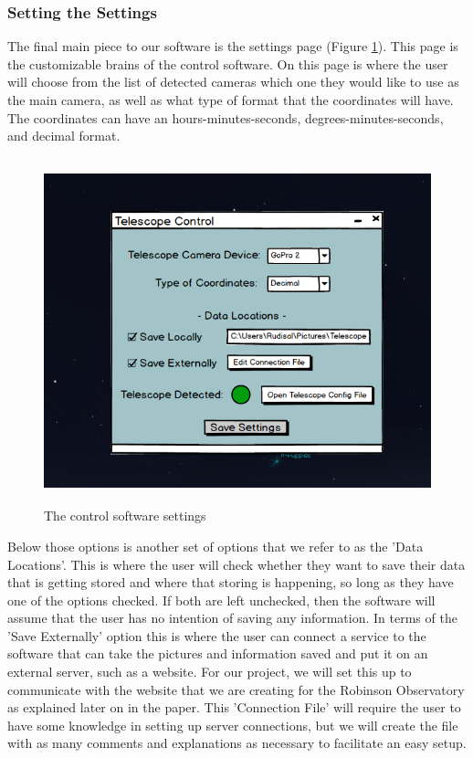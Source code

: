 \documentclass[12pt]{article}
\begin{document}
\newpage

\subsubsection{Setting the Settings}

The final main piece to our software is the settings page (Figure \ref{fig:Settings}). This page is the customizable brains of the control software. On this page is where the user will choose from the list of detected cameras which one they would like to use as the main camera, as well as what type of format that the coordinates will have. The coordinates can have an hours-minutes-seconds, degrees-minutes-seconds, and decimal format.

\begin{figure}[h]
	\centering
	\includegraphics[width=0.75\linewidth, height=10.0cm]{Settings}
	\caption{The control software settings}
	\label{fig:Settings}
\end{figure}



Below those options is another set of options that we refer to as the 'Data Locations'. This is where the user will check whether they want to save their data that is getting stored and where that storing is happening, so long as they have one of the options checked. If both are left unchecked, then the software will assume that the user has no intention of saving any information. In terms of the 'Save Externally' option this is where the user can connect a service to the software that can take the pictures and information saved and put it on an external server, such as a website. For our project, we will set this up to communicate with the website that we are creating for the Robinson Observatory as explained later on in the paper. This 'Connection File' will require the user to have some knowledge in setting up server connections, but we will create the file with as many comments and explanations as necessary to facilitate an easy setup.
\end{document}
